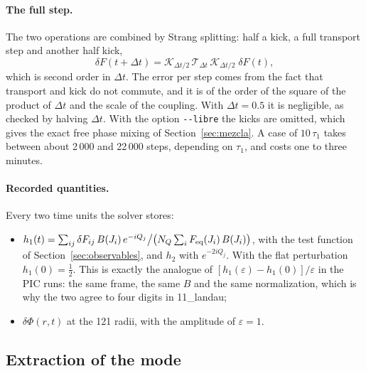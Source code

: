 \documentclass[11pt,a4paper]{article}
\begin{document}
\paragraph{The full step.} The two operations are combined by Strang splitting: half a
kick, a full transport step and another half kick,
\[
  \delta F(t+\Delta t) = \mathcal K_{\Delta t/2}\,\mathcal T_{\Delta t}\,\mathcal K_{\Delta t/2}\;\delta F(t),
\]
which is second order in $\Delta t$. The error per step comes from the fact that transport
and kick do not commute, and it is of the order of the square of the product of $\Delta t$ and
the scale of the coupling. With $\Delta t=0.5$ it is negligible, as checked by halving
$\Delta t$. With the option \texttt{-{}-libre} the kicks are omitted, which gives the exact free
phase mixing of Section~\ref{sec:mezcla}. A case of $10\,\tau_1$ takes between about 2\,000
and 22\,000 steps, depending on $\tau_1$, and costs one to three minutes.

\paragraph{Recorded quantities.} Every two time units the solver stores:
\begin{itemize}
\item $h_1(t)=\sum_{ij}\delta F_{ij}\,B(J_i)\,e^{-iQ_j}\big/\big(N_Q\sum_iF_{\rm eq}(J_i)\,B(J_i)\big)$, with the
test function of Section~\ref{sec:observables}, and $h_2$ with $e^{-2iQ_j}$. With the flat
perturbation $h_1(0)=\tfrac12$. This is exactly the analogue of $[h_1(\varepsilon)-h_1(0)]/\varepsilon$ in
the PIC runs: the same frame, the same $B$ and the same normalization, which is why the
two agree to four digits in 11\_landau;
\item $\delta\Phi(r,t)$ at the 121 radii, with the amplitude of $\varepsilon=1$.
\end{itemize}

\subsection{Extraction of the mode}
\label{sec:polo}
\end{document}
